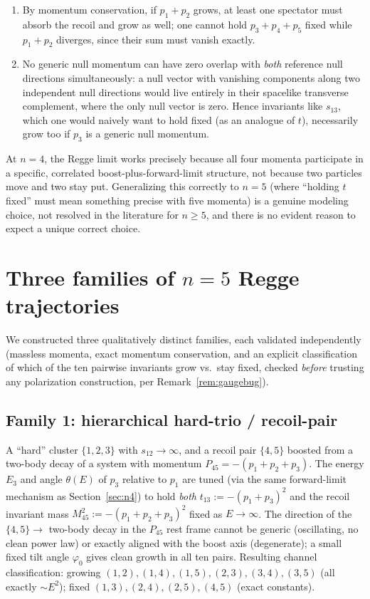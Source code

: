 \documentclass[reqno]{amsart}
\begin{document}
\begin{enumerate}
\item By momentum conservation, if $p_1+p_2$ grows, at least one spectator must absorb the recoil
and grow as well; one cannot hold $p_3+p_4+p_5$ fixed while $p_1+p_2$ diverges, since their sum
must vanish exactly.
\item No generic null momentum can have zero overlap with \emph{both} reference null directions
simultaneously: a null vector with vanishing components along two independent null directions
would live entirely in their spacelike transverse complement, where the only null vector is zero.
Hence invariants like $s_{13}$, which one would naively want to hold fixed (as an analogue of
$t$), necessarily grow too if $p_3$ is a generic null momentum.
\end{enumerate}

At $n=4$, the Regge limit works precisely because all four momenta participate in a specific,
correlated boost-plus-forward-limit structure, not because two particles move and two stay put.
Generalizing this correctly to $n=5$ (where ``holding $t$ fixed'' must mean something precise with
five momenta) is a genuine modeling choice, not resolved in the literature for $n\geq5$, and there
is no evident reason to expect a unique correct choice.

\section{Three families of \texorpdfstring{$n=5$}{n=5} Regge trajectories}
\label{sec:families}

We constructed three qualitatively distinct families, each validated independently (massless
momenta, exact momentum conservation, and an explicit classification of which of the ten pairwise
invariants grow vs.\ stay fixed, checked \emph{before} trusting any polarization construction, per
Remark~\ref{rem:gaugebug}).

\subsection{Family 1: hierarchical hard-trio / recoil-pair}
\label{sec:family1}

A ``hard'' cluster $\{1,2,3\}$ with $s_{12}\to\infty$, and a recoil pair $\{4,5\}$ boosted from a
two-body decay of a system with momentum $P_{45}=-(p_1+p_2+p_3)$. The energy $E_3$ and angle
$\theta(E)$ of $p_3$ relative to $p_1$ are tuned (via the same forward-limit mechanism as
Section~\ref{sec:n4}) to hold \emph{both} $t_{13}:=-(p_1+p_3)^2$ and the recoil invariant mass
$M_{45}^2:=-(p_1+p_2+p_3)^2$ fixed as $E\to\infty$. The direction of the $\{4,5\}\to$ two-body
decay in the $P_{45}$ rest frame cannot be generic (oscillating, no clean power law) or exactly
aligned with the boost axis (degenerate); a small fixed tilt angle $\varphi_0$ gives clean growth
in all ten pairs. Resulting channel classification: growing
$(1,2),(1,4),(1,5),(2,3),(3,4),(3,5)$ (all exactly $\sim E^2$); fixed $(1,3),(2,4),(2,5),(4,5)$
(exact constants).
\end{document}
